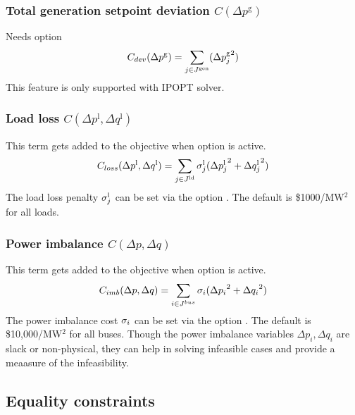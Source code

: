 \subsubsection{Total generation setpoint deviation $C(\Delta p^{\text{g}})$}
Needs option \opflowoption{\opflowobjective}{\mingensetpointdeviation}
\begin{equation}
C_{dev}(\Delta p^{\text{g}}) = \sum_{j \in J^\text{gen}} ({\Delta{p}^\text{g}_j}^2)
\label{eq:opf_obj_mingensetpointdev}
\end{equation}
This feature is only supported with IPOPT solver.

\subsubsection{Load loss $C(\Delta p^{\text{l}},\Delta q^{\text{l}})$}
This term gets added to the objective when  \option{\opflowincludeloadloss} option is active. 
\begin{equation}
C_{loss}(\Delta p^{\text{l}},\Delta q^{\text{l}}) =  \sum_{j \in J^\text{ld}} \sigma^\text{l}_j({\Delta{p}^{\text{l}}_j}^2 + {\Delta{q}^{\text{l}}_j}^2)
\label{eq:opf_obj_minloadloss}
\end{equation}
The load loss penalty $\sigma^\text{l}_j$ can be set via the option
. The default is \$1000/MW$^2$ for all loads.

\subsubsection{Power imbalance $C(\Delta p,\Delta q)$}
This term gets added to the objective when   option is active. 
\begin{equation}
C_{imb}(\Delta p,\Delta q) =  \sum_{i \in J^{bus}} \sigma_i({\Delta p_i}^2 + {\Delta q_i}^2)
\label{eq:opf_obj_minpowerimbalance}
\end{equation}
The power imbalance cost $\sigma_i$ can be set via the option
. The default is \$10,000/MW$^2$ for all buses. Though the power imbalance variables $\Delta p_i,\Delta q_i$ are slack or non-physical, they can help in solving infeasible cases and provide a meaasure of the infeasibility. 

\subsection{Equality constraints}\label{sec:opflow_eq}

